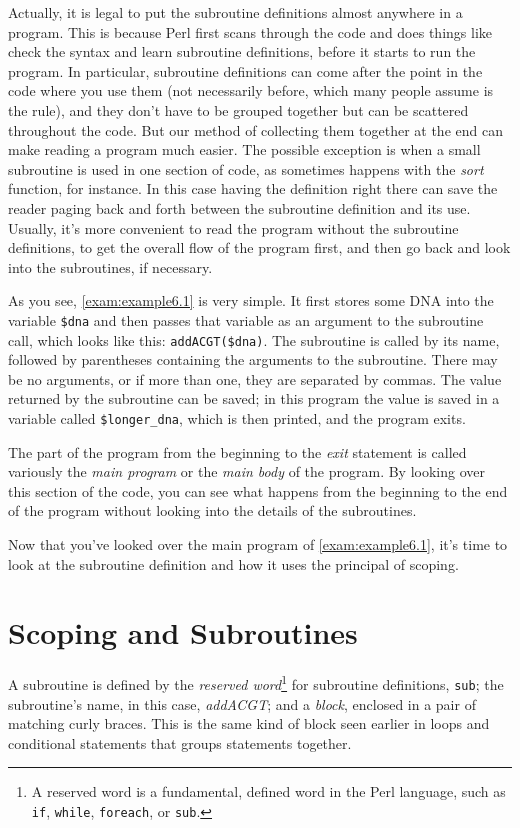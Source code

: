 Actually, it is legal to put the subroutine definitions almost anywhere in a program. This is because Perl first scans through the code and does things like check the syntax and learn subroutine definitions, before it starts to run the program. In particular, subroutine definitions can come after the point in the code where you use them (not necessarily before, which many people assume is the rule), and they don't have to be grouped together but can be scattered throughout the code. But our method of collecting them together at the end can make reading a program much easier. The possible exception is when a small subroutine is used in one section of code, as sometimes happens with the \textit{sort} function, for instance. In this case having the definition right there can save the reader paging back and forth between the subroutine definition and its use. Usually, it's more convenient to read the program without the subroutine definitions, to get the overall flow of the program first, and then go back and look into the subroutines, if necessary.

As you see, \autoref{exam:example6.1} is very simple. It first stores some DNA into the variable \verb|$dna| and then passes that variable as an argument to the subroutine call, which looks like this: \verb|addACGT($dna)|. The subroutine is called by its name, followed by parentheses containing the arguments to the subroutine. There may be no arguments, or if more than one, they are separated by commas. The value returned by the subroutine can be saved; in this program the value is saved in a variable called \verb|$longer_dna|, which is then printed, and the program exits.  

The part of the program from the beginning to the \textit{exit} statement is called variously the \textit{main program} or the \textit{main body} of the program. By looking over this section of the code, you can see what happens from the beginning to the end of the program without looking into the details of the subroutines.

Now that you've looked over the main program of \autoref{exam:example6.1}, it's time to look at the subroutine definition and how it uses the principal of scoping. 

\section{Scoping and Subroutines}
A subroutine is defined by the \textit{reserved word}\footnote{A reserved word is a fundamental, defined word in the Perl language, such as \verb|if|, \verb|while|, \verb|foreach|, or \verb|sub|.} for subroutine definitions, \verb|sub|; the subroutine's name, in this case, \textit{addACGT}; and a \textit{block}, enclosed in a pair of matching curly braces. This is the same kind of block seen earlier in loops and conditional statements that groups statements together.

